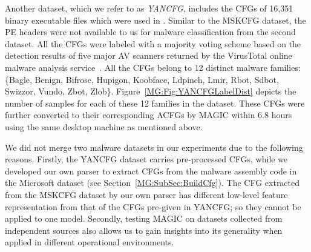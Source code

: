 Another dataset, which we refer to as \textit{YANCFG}, includes the CFGs of 16,351 binary executable files which were used in \cite{YanDataset}.
Similar to the MSKCFG dataset, the PE headers were not available to us for malware classification from the second dataset. All the CFGs were labeled with a majority voting scheme based on the detection results of five major AV scanners returned by the VirusTotal online malware analysis service~\cite{VirusTotal}.
All the CFGs belong to 12 distinct malware families: \{Bagle, Benign, Bifrose, Hupigon, Koobface, Ldpinch, Lmir, Rbot, Sdbot, Swizzor, Vundo, Zbot, Zlob\}.
Figure~\ref{MG:Fig:YANCFGLabelDist} depicts the number of samples for each of these 12 families in the dataset.
These CFGs were further converted to their corresponding ACFGs by MAGIC within 6.8 hours using the same desktop machine as mentioned above.


We did not merge two malware datasets in our experiments due to the following reasons.
Firstly, the YANCFG dataset carries pre-processed CFGs,
while we developed our own parser to extract CFGs from the malware assembly code in the Microsoft dataset (see Section~\ref{MG:SubSec:BuildCfg}).
The CFG extracted from the MSKCFG dataset by our own parser has different low-level feature representation from that of the CFGs pre-given in YANCFG;
so they cannot be applied to one model.
Secondly, testing MAGIC on datasets collected from independent sources also allows us to gain insights into its generality when applied in different operational environments.

